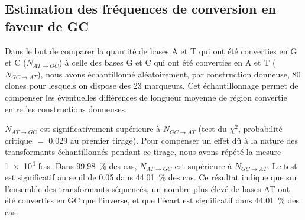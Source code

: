 \subsection{Estimation des fréquences de conversion en faveur de GC}
\label{subsec:result-freq}

Dans le but de comparer la quantité de bases A et T qui ont été converties en G
et C ($N_{AT \rightarrow GC}$) à celle des bases G et C qui ont été converties
en A et T ($N_{GC \rightarrow AT}$), nous avons échantillonné aléatoirement,
par construction donneuse, 80 clones pour lesquels on dispose des 23 marqueurs.
Cet échantillonnage permet de compenser les éventuelles différences de longueur
moyenne de région convertie entre les constructions donneuses.

$N_{AT \rightarrow GC}$ est significativement supérieure à $N_{GC \rightarrow
  AT}$ (test du $\chi^2$, probabilité critique \(=\) \num{0.029} au premier
tirage). Pour compenser un effet dû à la nature des transformants échantillonnés
pendant ce tirage, nous avons répété la mesure \num{1e4} fois. Dans
\SI{99.98}{\percent} des cas, $N_{AT \rightarrow GC}$ est supérieure à $N_{GC
  \rightarrow AT}$. Le test est significatif au seuil de \num{0.05} dans
\SI{44.01}{\percent} des cas. Ce résultat indique que sur l'ensemble des
transformants séquencés, un nombre plus élevé de bases AT ont été converties en
GC que l'inverse, et que l'écart est significatif dans \SI{44.01}{\percent} des
cas.
\newpage

